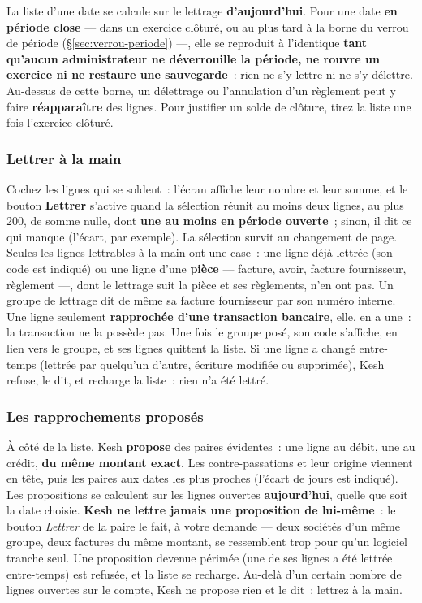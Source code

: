 \documentclass[a4paper,11pt,oneside]{article}
\begin{document}
\begin{keshwarning}[title={\faExclamationTriangle\ «~Au 31 décembre~» n'est pas un instantané}]
La liste d'une date se calcule sur le lettrage \textbf{d'aujourd'hui}. Pour une date \textbf{en
période close} --- dans un exercice clôturé, ou au plus tard à la borne du verrou de période
(\S\ref{sec:verrou-periode}) ---, elle se reproduit à l'identique \textbf{tant qu'aucun
administrateur ne déverrouille la période, ne rouvre un exercice ni ne restaure une
sauvegarde}~: rien ne s'y lettre ni ne s'y délettre. Au-dessus de cette borne, un délettrage
ou l'annulation d'un règlement peut y faire \textbf{réapparaître} des lignes. Pour justifier un
solde de clôture, tirez la liste une fois l'exercice clôturé.
\end{keshwarning}

\subsubsection{Lettrer à la main}

Cochez les lignes qui se soldent~: l'écran affiche leur nombre et leur somme, et le bouton
\textbf{Lettrer} s'active quand la sélection réunit au moins deux lignes, au plus 200, de somme
nulle, dont \textbf{une au moins en période ouverte}~; sinon, il dit ce qui manque (l'écart, par
exemple). La sélection survit au changement de page. Seules les lignes lettrables à la main
ont une case~: une ligne déjà lettrée (son code est indiqué) ou une ligne d'une
\textbf{pièce} --- facture, avoir, facture fournisseur, règlement ---, dont le lettrage suit la
pièce et ses règlements, n'en ont pas. Un groupe de lettrage dit de même sa facture fournisseur par son numéro interne. Une ligne seulement \textbf{rapprochée d'une transaction
bancaire}, elle, en a une~: la transaction ne la possède pas. Une fois le
groupe posé, son code s'affiche, en lien vers le groupe, et ses lignes quittent la liste. Si
une ligne a changé entre-temps (lettrée par quelqu'un d'autre, écriture modifiée ou
supprimée), Kesh refuse, le dit, et recharge la liste~: rien n'a été lettré.

\subsubsection{Les rapprochements proposés}

À côté de la liste, Kesh \textbf{propose} des paires évidentes~: une ligne au débit, une au
crédit, \textbf{du même montant exact}. Les contre-passations et leur origine viennent en tête,
puis les paires aux dates les plus proches (l'écart de jours est indiqué). Les propositions se
calculent sur les lignes ouvertes \textbf{aujourd'hui}, quelle que soit la date choisie.
\textbf{Kesh ne lettre jamais une proposition de lui-même}~: le bouton \emph{Lettrer} de la
paire le fait, à votre demande --- deux sociétés d'un même groupe, deux factures du même
montant, se ressemblent trop pour qu'un logiciel tranche seul. Une proposition devenue
périmée (une de ses lignes a été lettrée entre-temps) est refusée, et la liste se recharge.
Au-delà d'un certain nombre de lignes ouvertes sur le compte, Kesh ne propose rien et le dit~:
lettrez à la main.
\end{document}
